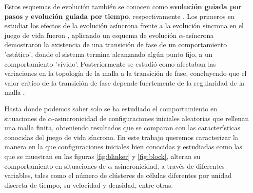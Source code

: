 \documentclass[../proyecto.tex]{book}
\begin{document}
Estos esquemas de evolución también se conocen como \textbf{evolución guiada por pasos} y \textbf{evolución guiada por tiempo}, respectivamente \cite{aka}. Los primeros en estudiar los efectos de la evolución asíncrona frente a la evolución síncrona en el juego de vida fueron \cite{syncVSasync}, aplicando un esquema de evolución $\alpha$-asíncrona demostraron la existencia de una transición de fase de un comportamiento 'estático', donde el sistema termina alcanzando algún punto fijo, a un comportamiento 'vívido'. Posteriormente se estudió como afectaban las variaciones en la topología de la malla a la transición de fase, concluyendo que el valor crítico de la transición de fase depende fuertemente de la regularidad de la malla \cite{mallaIrregular1, mallaIrregular2}.

Hasta donde podemos saber solo se ha estudiado el comportamiento en situaciones de $\alpha$-asincronicidad de configuraciones iniciales aleatorias que rellenan una malla finita, obteniendo resultados que se comparan con las características conocidas del juego de vida síncrono. En este trabajo queremos caracterizar la manera en la que configuraciones iniciales bien conocidas y estudiadas como las que se muestran en las figuras \ref{fig:blinker} y \ref{fig:block}, alteran su comportamiento en situaciones de $\alpha$-asincronicidad, a través de diferentes variables, tales como el número de clústeres de células diferentes por unidad discreta de tiempo, su velocidad y densidad, entre otras.
\end{document}
